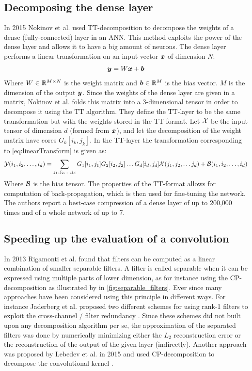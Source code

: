 \subsection{Decomposing the dense layer}
In 2015 Nokinov et al. used TT-decomposition to decompose the weights of a dense (fully-connected) layer in an ANN\cite{Novikov2015}. This method exploits the power of the dense layer and allows it to have a big amount of neurons. The dense layer performs a linear transformation on an input vector $\boldsymbol{x}$ of dimension $N$:
\begin{equation}
    \boldsymbol{y} = W \boldsymbol{x} + \boldsymbol{b}
    \label{eq:linearTransform}
\end{equation}
Where $W \in \mathbb{R}^{M\times N}$ is the weight matrix and $\boldsymbol{b} \in \mathbb{R}^{M}$ is the bias vector. $M$ is the dimension of the output $\boldsymbol{y}$. Since the weights of the dense layer are given in a matrix, Nokinov et al. folds this matrix into a 3-dimensional tensor in order to decompose it using the TT algorithm. They define the TT-layer to be the same transformation but with the weights stored in the TT-format. Let $\mathcal{X}$ be the input tensor of dimension $d$ (formed from $\boldsymbol{x}$), and let the decomposition of the weight matrix have cores $G_k[i_k, j_k]$. In the TT-layer the transformation corresponding to \eqref{eq:linearTransform} is given as:
\begin{equation}
    \mathcal{Y}(i_1, i_2, \dots, i_d) = \sum_{j_1, j_2, \dots, j_d} G_1[i_1, j_1] G_2[i_2, j_2]\dots G_d[i_d, j_d] \mathcal{X}(j_1, j_2, \dots j_d) + \mathcal{B}(i_1, i_2, \dots, i_d)
\end{equation}
Where $\mathcal{B}$ is the bias tensor. The properties of the TT-format allows for computation of back-propagation, which is then used for fine-tuning the network. The authors report a best-case compression of a dense layer of up to 200,000 times and of a whole network of up to 7.

\subsection{Speeding up the evaluation of a convolution}
In 2013 Rigamonti et al. \cite{Rigamonti2013} found that filters can be computed as a linear combination of smaller separable filters. A filter is called separable when it can be expressed using multiple parts of lower dimension, as for instance using the CP-decomposition as illustrated by \cite{Sironi2015} in \autoref{fig:separable_filters}. Ever since many approaches have been considered using this principle in different ways. For instance Jaderberg et al. proposed two different schemes for using rank-1 filters to exploit the cross-channel / filter redundancy \cite{Jaderberg2014}. Since these schemes did not built upon any decomposition algorithm per se, the approximation of the separated filters was done by numerically minimizing either the $L_2$ reconstruction error or the reconstruction of the output of the given layer (indirectly). Another approach was proposed by Lebedev et al. in 2015 and used CP-decomposition to decompose the convolutional kernel \cite{Lebedev2015}.


